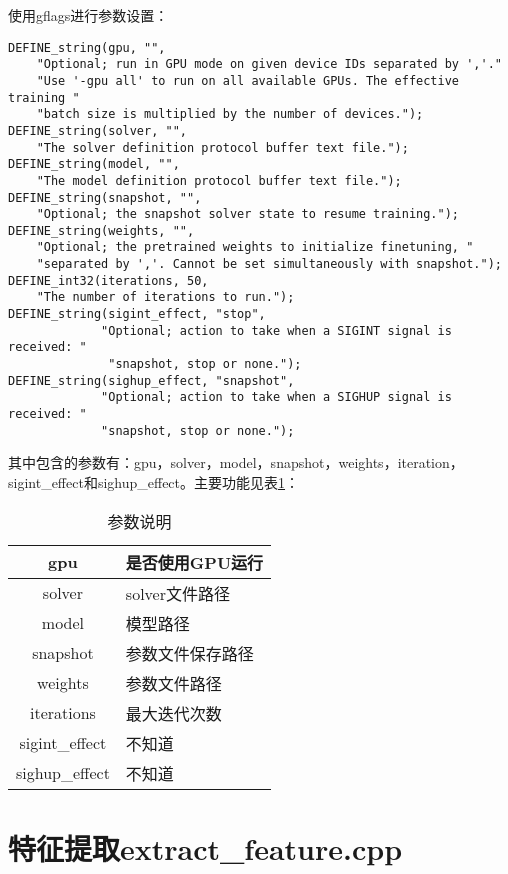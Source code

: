 \documentclass{NanCNBook}
\begin{document}
使用gflags进行参数设置：
\begin{verbatim}
DEFINE_string(gpu, "",
    "Optional; run in GPU mode on given device IDs separated by ','."
    "Use '-gpu all' to run on all available GPUs. The effective training "
    "batch size is multiplied by the number of devices.");
DEFINE_string(solver, "",
    "The solver definition protocol buffer text file.");
DEFINE_string(model, "",
    "The model definition protocol buffer text file.");
DEFINE_string(snapshot, "",
    "Optional; the snapshot solver state to resume training.");
DEFINE_string(weights, "",
    "Optional; the pretrained weights to initialize finetuning, "
    "separated by ','. Cannot be set simultaneously with snapshot.");
DEFINE_int32(iterations, 50,
    "The number of iterations to run.");
DEFINE_string(sigint_effect, "stop",
             "Optional; action to take when a SIGINT signal is received: "
              "snapshot, stop or none.");
DEFINE_string(sighup_effect, "snapshot",
             "Optional; action to take when a SIGHUP signal is received: "
             "snapshot, stop or none.");
\end{verbatim}
其中包含的参数有：gpu，solver，model，snapshot，weights，iteration，sigint\_effect和sighup\_effect。主要功能见表\ref{tab:参数说明}：
\begin{table}[h]
  \setlength{\abovecaptionskip}{-5pt}
  \caption{参数说明}
  \centering
  \begin{tabular}{|c|l|}
    \hline
    gpu & 是否使用GPU运行 \\ \hline
    solver & solver文件路径 \\ \hline
    model & 模型路径 \\ \hline
    snapshot & 参数文件保存路径 \\ \hline
    weights & 参数文件路径 \\ \hline
    iterations & 最大迭代次数 \\ \hline
    sigint\_effect & 不知道 \\ \hline
    sighup\_effect & 不知道 \\
    \hline
  \end{tabular}
  \label{tab:参数说明}
\end{table}
                    



\section{特征提取extract\_feature.cpp}
\end{document}
